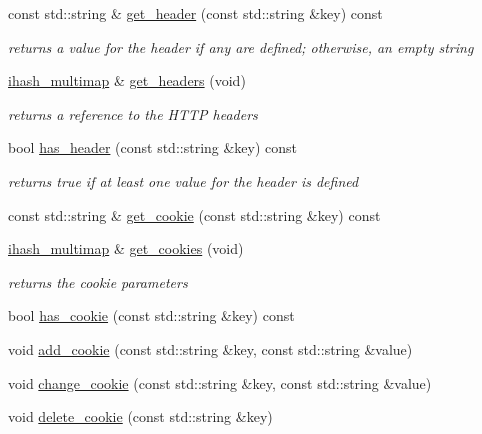 \begin{DoxyCompactItemize}
const std\-::string \& \hyperlink{classpion_1_1http_1_1message_ab9e2735d01890cd8e93f86390cd46969}{get\-\_\-header} (const std\-::string \&key) const 
\begin{DoxyCompactList}\small\item\em returns a value for the header if any are defined; otherwise, an empty string \end{DoxyCompactList}\item 
\hyperlink{namespacepion_a2cd31d7bbe0e98008bd4e6f135103c0e}{ihash\-\_\-multimap} \& \hyperlink{classpion_1_1http_1_1message_a8d067675e0396114e814ad688bed2b4f}{get\-\_\-headers} (void)
\begin{DoxyCompactList}\small\item\em returns a reference to the H\-T\-T\-P headers \end{DoxyCompactList}\item 
bool \hyperlink{classpion_1_1http_1_1message_ac6667e7a771b157e24858700b4777223}{has\-\_\-header} (const std\-::string \&key) const 
\begin{DoxyCompactList}\small\item\em returns true if at least one value for the header is defined \end{DoxyCompactList}\item 
const std\-::string \& \hyperlink{classpion_1_1http_1_1message_a735de2125e0b3c3a8caae7fad757cfc0}{get\-\_\-cookie} (const std\-::string \&key) const 
\item 
\hyperlink{namespacepion_a2cd31d7bbe0e98008bd4e6f135103c0e}{ihash\-\_\-multimap} \& \hyperlink{classpion_1_1http_1_1message_ab5e744890af0936eda97c21888bb4a2e}{get\-\_\-cookies} (void)
\begin{DoxyCompactList}\small\item\em returns the cookie parameters \end{DoxyCompactList}\item 
bool \hyperlink{classpion_1_1http_1_1message_af033e860c1f7295a6ef8eb5ea75f53e8}{has\-\_\-cookie} (const std\-::string \&key) const 
\item 
void \hyperlink{classpion_1_1http_1_1message_a0bc8756a9db916d5423dad19211de771}{add\-\_\-cookie} (const std\-::string \&key, const std\-::string \&value)
\item 
void \hyperlink{classpion_1_1http_1_1message_a1bfed0c1dc6a76384798c51ae74ea2da}{change\-\_\-cookie} (const std\-::string \&key, const std\-::string \&value)
\item 
void \hyperlink{classpion_1_1http_1_1message_a79e4153703ae62a1b8b0585510d032fd}{delete\-\_\-cookie} (const std\-::string \&key)

\end{DoxyCompactItemize}
